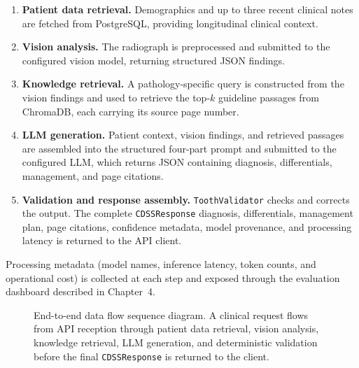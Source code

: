 \documentclass[12pt,a4paper]{report}
\begin{document}
	\begin{enumerate}
		\item \textbf{Patient data retrieval.} Demographics and up to three recent clinical notes
		are fetched from PostgreSQL, providing longitudinal clinical context.
		\item \textbf{Vision analysis.} The radiograph is preprocessed and submitted to the
		configured vision model, returning structured JSON findings.
		\item \textbf{Knowledge retrieval.} A pathology-specific query is constructed from the
		vision findings and used to retrieve the top-$k$ guideline passages from ChromaDB,
		each carrying its source page number.
		\item \textbf{LLM generation.} Patient context, vision findings, and retrieved passages
		are assembled into the structured four-part prompt and submitted to the configured LLM,
		which returns JSON containing diagnosis, differentials, management, and page citations.
		\item \textbf{Validation and response assembly.} \texttt{ToothValidator} checks and
		corrects the output. The complete \texttt{CDSSResponse} diagnosis, differentials,
		management plan, page citations, confidence metadata, model provenance, and processing
		latency is returned to the API client.
	\end{enumerate}
	
	Processing metadata (model names, inference latency, token counts, and operational cost)
	is collected at each step and exposed through the evaluation dashboard described in
	Chapter~4.
	
	\begin{figure}[h]
		\centering
		\caption{End-to-end data flow sequence diagram. A clinical request flows from API
			reception through patient data retrieval, vision analysis, knowledge retrieval,
			LLM generation, and deterministic validation before the final
			\texttt{CDSSResponse} is returned to the client.}
		\label{fig:dataflow}
	\end{figure}
	
\end{document}
